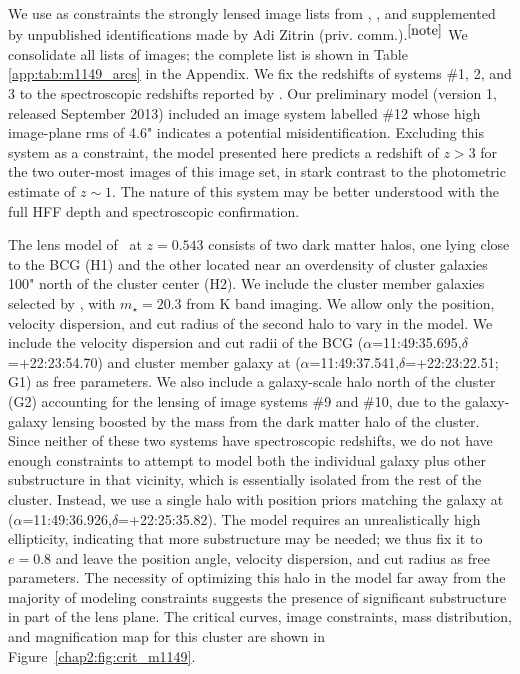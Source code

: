 \subsection{\MACSeleven}

We use as constraints the strongly lensed image lists from \citet{Smith:2009lr}, \citet{Zitrin:2009kx}, and \citet{Zheng:2012fk} supplemented by unpublished identifications made by Adi Zitrin (priv. comm.).$^{\ref{note}}$ We consolidate all lists of images; the complete list is shown in Table \ref{app:tab:m1149_arcs} in the Appendix.  We fix the redshifts of systems \#1, 2, and 3 to the spectroscopic redshifts reported by \citet{Smith:2009lr}. Our preliminary model (version 1, released September 2013) included an image system labelled \#12 whose high image-plane rms of 4.6" indicates a potential misidentification. Excluding this system as a constraint, the model presented here predicts a redshift of $z>3$ for the two outer-most images of this image set, in stark contrast to the photometric estimate of $z\sim1$. The nature of this system may be better understood with the full HFF depth and spectroscopic confirmation.

The lens model of \MACSeleven\ at $z=0.543$ consists of two dark matter halos, one lying close to the BCG (H1) and the other located near an overdensity of cluster galaxies 100" north of the cluster center (H2). We include the cluster member galaxies selected by \cite{Smith:2009lr}, with $m_\star=20.3$ from K band imaging. We allow only the position, velocity dispersion, and cut radius of the second halo to vary in the model. We include the velocity dispersion and cut radii of the BCG ($\alpha$=11:49:35.695,$\delta$=+22:23:54.70) and cluster member galaxy at ($\alpha$=11:49:37.541,$\delta$=+22:23:22.51; G1) as free parameters. We also include a galaxy-scale halo north of the cluster (G2) accounting for the lensing of image systems \#9 and \#10, due to the galaxy-galaxy lensing boosted by the mass from the dark matter halo of the cluster. Since neither of these two systems have spectroscopic redshifts, we do not have enough constraints to attempt to model both the individual galaxy plus other substructure in that vicinity, which is essentially isolated from the rest of the cluster. Instead, we use a single halo with position priors matching the galaxy at ($\alpha$=11:49:36.926,$\delta$=+22:25:35.82). The model requires an unrealistically high ellipticity, indicating that more substructure may be needed; we thus fix it to $e=0.8$ and leave the position angle, velocity dispersion, and cut radius as free parameters. The necessity of optimizing this halo in the model far away from the majority of modeling constraints suggests the presence of significant substructure in part of the lens plane. The critical curves, image constraints, mass distribution, and magnification map for this cluster are shown in Figure~\ref{chap2:fig:crit_m1149}.

